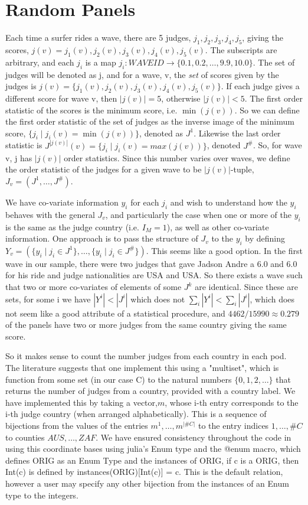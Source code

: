 \documentclass{article}
\begin{document}
\section{Random Panels}

Each time a surfer rides a wave, there are 5 judges, $j_1,j_2,j_3,j_4,j_5$, giving the scores, $j(v)=j_1(v),j_2(v),j_3(v),j_4(v),j_5(v)$. The subscripts are arbitrary, and each $j_i$ is a map $j_i:WAVEID \rightarrow \{0.1,0.2,\dots,9.9,10.0\}$. The set of judges will be denoted as j, and for a wave, v, the \textit{set} of scores given by the judges is $j(v) = \{j_1(v),j_2(v),j_3(v),j_4(v),j_5(v)\}$. If each judge gives a different score for wave v, then $|j(v)| = 5$, otherwise $|j(v)| < 5$. The first order statistic of the scores is the minimum score, i.e. $\min(j(v))$. So we can define the first order statistic of the set of judges as the inverse image of the minimum score, $\{j_i \mid j_i(v) = \min(j(v))\}$, denoted as $J^1$. Likewise the last order statistic is $J^{|j(v)|}(v) = \{ j_i \mid j_i(v) = max(j(v))\}$, denoted $J^\#$. So, for wave v, j has $|j(v)|$ order statistics. Since this number varies over waves, we define the order statistic of the judges for a given wave to be $|j(v)|$-tuple, $J_v = (J^1,\dots,J^\#)$.

We have co-variate information $y_i$ for each $j_i$ and wish to understand how the $y_i$ behaves with the general $J_v$, and particularly the case when one or more of the $y_i$ is the same as the judge country (i.e. $I_M = 1$), as well as other co-variate information. One approach is to pass the structure of $J_v$ to the $y_i$ by defining $ Y_v = (\{y_i \mid j_i \in J^1\}, \dots, \{y_i \mid j_i \in J^\#\})$. This seems like a good option. In the first wave in our sample, there were two judges that gave Jadson Andre a 6.0 and 6.0 for his ride and judge nationalities are USA and USA. So there exists a wave such that two or more co-variates of elements of some $J^k$ are identical. Since these are sets, for some i we have $|Y^i|<|J^i|$ which does not $\sum_i |Y^i| < \sum_i |J^i|$, which does not seem like a good attribute of a statistical procedure, and $4462/15990 \approx 0.279$ of the panels have two or more judges from the same country giving the same score.

So it makes sense to count the number judges from each country in each pod. The literature suggests that one implement this using a "multiset", which is function from some set (in our case C) to the natural numbers $\{0,1,2,\dots\}$ that returns the number of judges from a country, provided with a country label. We have implemented this by taking a vector,$m$, whose i-th entry corresponds to the i-th judge country (when arranged alphabetically). This is a sequence of bijections from the values of the entries $m^1,\dots,m^{|\#C|}$ to the entry indices $1,\dots,\#C$ to counties $AUS,\dots,ZAF$. We have ensured consistency throughout the code in using this coordinate bases using julia's Enum type and the @enum macro, which defines ORIG as an Enum Type and the instances of ORIG, if c is a ORIG, then Int(c) is defined by instances(ORIG)[Int(c)] = c. This is the default relation, however a user may specify any other bijection from the instances of an Enum type to the integers.
\end{document}
